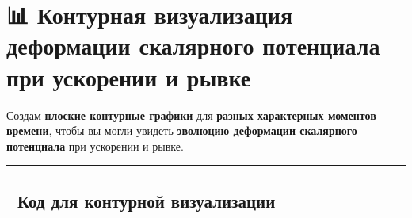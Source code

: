 \documentclass[11pt]{article}
\begin{document}
\section{📊 Контурная визуализация деформации скалярного потенциала при
ускорении и
рывке}\label{ux43aux43eux43dux442ux443ux440ux43dux430ux44f-ux432ux438ux437ux443ux430ux43bux438ux437ux430ux446ux438ux44f-ux434ux435ux444ux43eux440ux43cux430ux446ux438ux438-ux441ux43aux430ux43bux44fux440ux43dux43eux433ux43e-ux43fux43eux442ux435ux43dux446ux438ux430ux43bux430-ux43fux440ux438-ux443ux441ux43aux43eux440ux435ux43dux438ux438-ux438-ux440ux44bux432ux43aux435}

Создам \textbf{плоские контурные графики} для \textbf{разных характерных
моментов времени}, чтобы вы могли увидеть \textbf{эволюцию деформации
скалярного потенциала} при ускорении и рывке.

\begin{center}\rule{0.5\linewidth}{\linethickness}\end{center}

\subsection{🔹 Код для контурной
визуализации}\label{ux43aux43eux434-ux434ux43bux44f-ux43aux43eux43dux442ux443ux440ux43dux43eux439-ux432ux438ux437ux443ux430ux43bux438ux437ux430ux446ux438ux438}
\end{document}
